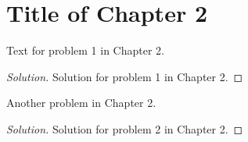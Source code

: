\section{Title of Chapter 2}

\begin{problem}[1]
Text for problem 1 in Chapter 2.
\end{problem}
\begin{proof}[Solution]
    Solution for problem 1 in Chapter 2.
\end{proof}

\begin{problem}[2]
Another problem in Chapter 2.
\end{problem}
\begin{proof}[Solution]
    Solution for problem 2 in Chapter 2.
\end{proof}
